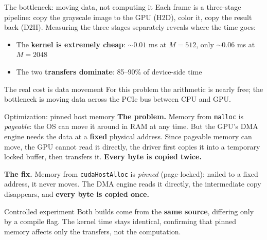\documentclass[11pt,aspectratio=169]{beamer}
\begin{document}
\begin{frame}{The bottleneck: moving data, not computing it}
  Each frame is a three-stage pipeline: copy the grayscale image to the
  GPU (H2D), color it, copy the result back (D2H). Measuring the three
  stages separately reveals where the time goes:
  \begin{itemize}
    \item The \textbf{kernel is extremely cheap}: $\sim 0.01$ ms at
      $M=512$, only $\sim 0.06$ ms at $M=2048$
    \item The two \textbf{transfers dominate}: 85--90\% of device-side time
  \end{itemize}
  \vspace{0.2cm}
  \begin{alertblock}{The real cost is data movement}
    For this problem the arithmetic is nearly free; the bottleneck is
    moving data across the PCIe bus between CPU and GPU. 
  \end{alertblock}
\end{frame}

\begin{frame}{Optimization: pinned host memory}
  \textbf{The problem.} Memory from \texttt{malloc} is \emph{pageable}:
  the OS can move it around in RAM at any time. But the GPU's DMA engine
  needs the data at a \textbf{fixed} physical address. Since pageable
  memory can move, the GPU cannot read it directly, the driver first
  copies it into a temporary locked buffer, then transfers it.
  \textbf{Every byte is copied twice.}
  \vspace{0.3cm}

  \textbf{The fix.} Memory from \texttt{cudaHostAlloc} is \emph{pinned}
  (page-locked): nailed to a fixed address, it never moves. The DMA
  engine reads it directly, the intermediate copy disappears, and
  \textbf{every byte is copied once.}
  \vspace{0.3cm}

  \begin{block}{Controlled experiment}
    Both builds come from the \textbf{same source}, differing only by a
    compile flag. The kernel time stays identical, confirming that pinned
    memory affects only the transfers, not the computation.
  \end{block}
\end{frame}
\end{document}
